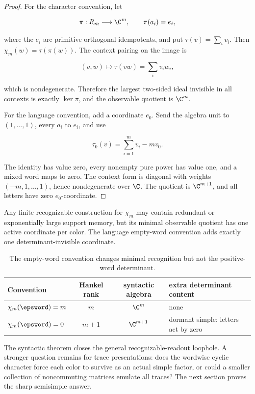 \begin{proof}
For the character convention, let

\[
 \pi:R_m\longrightarrow\C^m,
 \qquad \pi(a_i)=e_i,
\]

where the \(e_i\) are primitive orthogonal idempotents, and put
\(\tau(v)=\sum_i v_i\).  Then
\(\chi_m(w)=\tau(\pi(w))\).  The context pairing on the image is

\[
 (v,w)\longmapsto\tau(vw)=\sum_i v_iw_i,
\]

which is nondegenerate.  Therefore the largest two-sided ideal invisible in
all contexts is exactly \(\ker\pi\), and the observable quotient is \(\C^m\).

For the language convention, add a coordinate \(e_0\).  Send the algebra unit
to \((1,\ldots,1)\), every \(a_i\) to \(e_i\), and use

\[
 \tau_0(v)=\sum_{i=1}^m v_i-mv_0.
\]

The identity has value zero, every nonempty pure power has value one, and a
mixed word maps to zero.  The context form is diagonal with weights
\((-m,1,\ldots,1)\), hence nondegenerate over \(\C\).  The quotient is
\(\C^{m+1}\), and all letters have zero \(e_0\)-coordinate.
\end{proof}

\begin{corollary}
Any finite recognizable construction for \(\chi_m\) may contain redundant or
exponentially large support memory, but its minimal observable quotient has
one active coordinate per color.  The language empty-word convention adds
exactly one determinant-invisible coordinate.
\end{corollary}

\begin{table}[t]
\centering
\small
\caption{The empty-word convention changes minimal recognition but not the
positive-word determinant.}
\label{tab:empty-word}
\begin{tabularx}{\textwidth}{L{33mm} c c Y}
\toprule
Convention & Hankel rank & syntactic algebra & extra determinant content \\
\midrule
\(\chi_m(\epsword)=m\) & \(m\) & \(\C^m\) & none \\
\(\chi_m(\epsword)=0\) & \(m+1\) & \(\C^{m+1}\) & dormant simple; letters act by zero \\
\bottomrule
\end{tabularx}
\end{table}

The syntactic theorem closes the general recognizable-readout loophole.  A
stronger question remains for trace presentations: does the wordwise cyclic
character force each color to survive as an actual simple factor, or could a
smaller collection of noncommuting matrices emulate all traces?  The next
section proves the sharp semisimple answer.
